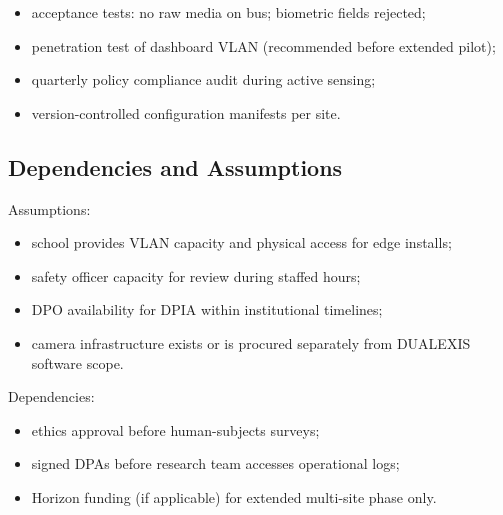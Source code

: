 \begin{itemize}[noitemsep]
  \item acceptance tests: no raw media on bus; biometric fields rejected;
  \item penetration test of dashboard VLAN (recommended before extended pilot);
  \item quarterly policy compliance audit during active sensing;
  \item version-controlled configuration manifests per site.
\end{itemize}

\subsection{Dependencies and Assumptions}

Assumptions:
\begin{itemize}[noitemsep]
  \item school provides VLAN capacity and physical access for edge installs;
  \item safety officer capacity for review during staffed hours;
  \item DPO availability for DPIA within institutional timelines;
  \item camera infrastructure exists or is procured separately from DUALEXIS software scope.
\end{itemize}

Dependencies:
\begin{itemize}[noitemsep]
  \item ethics approval before human-subjects surveys;
  \item signed DPAs before research team accesses operational logs;
  \item Horizon funding (if applicable) for extended multi-site phase only.
\end{itemize}
